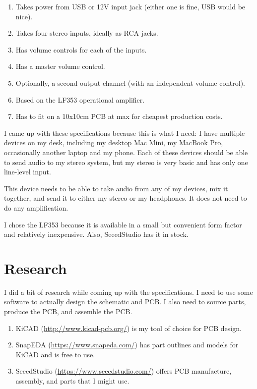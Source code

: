 \documentclass[a4paper]{article}
\begin{document}
\begin{enumerate}
  \item Takes power from USB or 12V input jack (either one is fine, USB would be nice).
  \item Takes four stereo inputs, ideally as RCA jacks.
  \item Has volume controls for each of the inputs.
  \item Has a master volume control.
  \item Optionally, a second output channel (with an independent volume control).
  \item Based on the LF353 operational amplifier.
  \item Has to fit on a 10x10cm PCB at max for cheapest production costs.
\end{enumerate}

I came up with these specifications because this is what I need: I have multiple devices on my desk, including my desktop Mac Mini, my MacBook Pro, occasionally another laptop and my phone. Each of these devices should be able to send audio to my stereo system, but my stereo is very basic and has only one line-level input.

This device needs to be able to take audio from any of my devices, mix it together, and send it to either my stereo or my headphones. It does not need to do any amplification.

I chose the LF353 because it is available in a small but convenient form factor and relatively inexpensive. Also, SeeedStudio has it in stock.

\section{Research}

I did a bit of research while coming up with the specifications. I need to use some software to actually design the schematic and PCB. I also need to source parts, produce the PCB, and assemble the PCB.

\begin{enumerate}
  \item KiCAD (\url{http://www.kicad-pcb.org/}) is my tool of choice for PCB design.
  \item SnapEDA (\url{https://www.snapeda.com/}) has part outlines and models for KiCAD and is free to use.
  \item SeeedStudio (\url{https://www.seeedstudio.com/}) offers PCB manufacture, assembly, and parts that I might use.
\end{enumerate}
\end{document}
